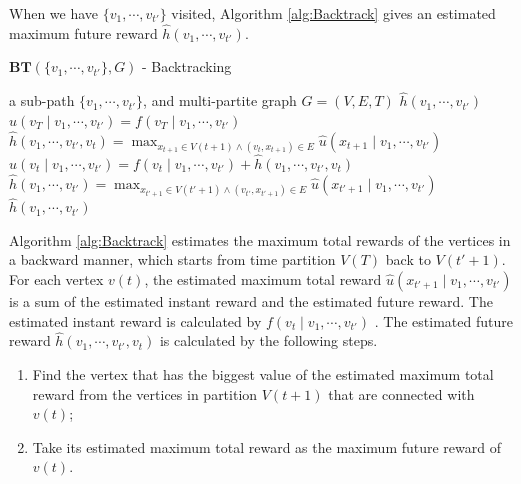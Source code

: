 When we have $ \{ v_{1} , \cdots , v_{t'} \} $ visited, Algorithm \ref{alg:Backtrack} gives an estimated maximum future reward $ \hat{h}( v_{1} , \cdots , v_{t'} ) $. 
 
\begin{algorithm}
\caption{ $ \mathbf{BT}( \{ v_{1} , \cdots , v_{t'} \}, G ) $ - Backtracking }
\label{alg:Backtrack}
\begin{algorithmic}[1]
\REQUIRE
a sub-path $ \{ v_{1} , \cdots , v_{t'} \} $, and multi-partite graph $ G = ( V, E, T ) $
\ENSURE $ \hat{h}( v_{1} , \cdots , v_{t'} ) $ \\
\STATE $ \hat{u}(v_{T} \mid v_{1} , \cdots , v_{t'} ) = f(v_{T} \mid v_{1} , \cdots , v_{t'} ) $
\ELSE
\STATE $ \hat{h}( v_{1} , \cdots , v_{t'},  v_{t} ) = \max_{ { x_{t+1} \in V(t+1) } \land { (v_{t}, x_{t+1}) \in E } } \hat{u}(x_{t+1} \mid v_{1} , \cdots , v_{t'} ) $
\STATE $ \hat{u}(v_{t} \mid v_{1} , \cdots , v_{t'} ) = f(v_{t} \mid v_{1} , \cdots , v_{t'} ) + \hat{h}( v_{1} , \cdots , v_{t'} , v_{t}) $
\ENDIF
\ENDFOR
\ENDFOR
\STATE  $ \hat{h}( v_{1} , \cdots , v_{t'} ) = \max_{ {x_{t'+1} \in V(t'+1)} \land {(v_{t'}, x_{t'+1}) \in E} } \hat{u}(x_{t'+1} \mid v_{1} , \cdots , v_{t'} ) $
\RETURN $ \hat{h}( v_{1} , \cdots , v_{t'} )  $
\end{algorithmic}
\end{algorithm}

Algorithm \ref{alg:Backtrack} estimates the maximum total rewards of the vertices in a backward manner, which starts from time partition $ V(T) $ back to $ V(t'+1) $.
For each vertex $ v(t) $, the estimated maximum total reward $ \hat{u}(x_{t'+1} \mid v_{1} , \cdots , v_{t'} ) $ is a sum of the estimated instant reward and the estimated future reward.
The estimated instant reward is calculated by $ f(v_{t} \mid v_{1} , \cdots , v_{t'} ) $ .
The estimated future reward $ \hat{h}( v_{1} , \cdots , v_{t'} , v_{t}) $ is calculated by the following steps.
\begin{enumerate}
\item Find the vertex that has the biggest value of the estimated maximum total reward from the vertices in partition $ V(t+1) $ that are connected with $ v(t) $;
\item Take its estimated maximum total reward as the maximum future reward of $ v(t) $.
\end{enumerate}


